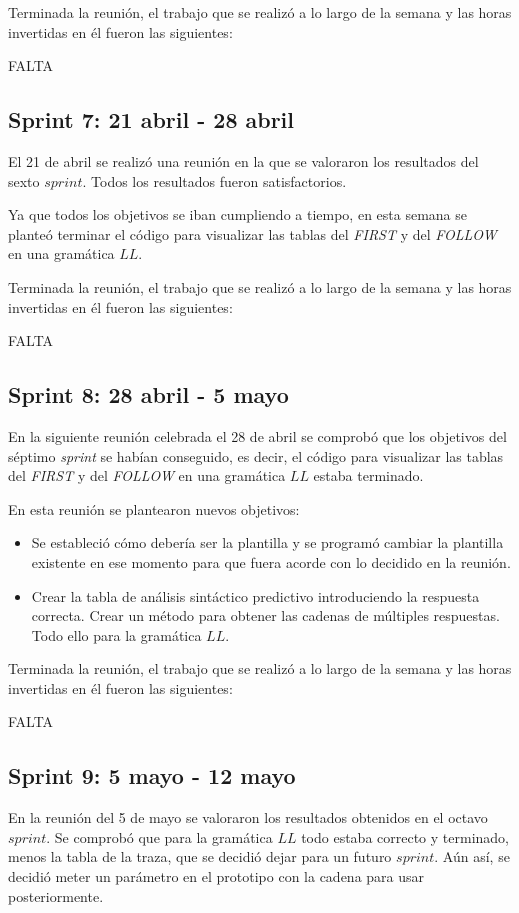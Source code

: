 Terminada la reunión, el trabajo que se realizó a lo largo de la semana y las horas invertidas en él fueron las siguientes:

FALTA

\subsection{Sprint 7: 21 abril - 28 abril}
El 21 de abril se realizó una reunión en la que se valoraron los resultados del sexto $sprint$. Todos los resultados fueron satisfactorios.

Ya que todos los objetivos se iban cumpliendo a tiempo, en esta semana se planteó terminar el código para visualizar las tablas del \textit{FIRST} y del \textit{FOLLOW} en una gramática $LL$.

Terminada la reunión, el trabajo que se realizó a lo largo de la semana y las horas invertidas en él fueron las siguientes:

FALTA
\subsection{Sprint 8: 28 abril - 5 mayo}
En la siguiente reunión celebrada el 28 de abril se comprobó que los objetivos del séptimo \textit{sprint} se habían conseguido, es decir, el código para visualizar las tablas del \textit{FIRST} y del \textit{FOLLOW} en una gramática $LL$ estaba terminado.

En esta reunión se plantearon nuevos objetivos:
\begin{itemize}
\item Se estableció cómo debería ser la plantilla y se programó cambiar la plantilla existente en ese momento para que fuera acorde con lo decidido en la reunión.
\item Crear la tabla de análisis sintáctico predictivo introduciendo la respuesta correcta. Crear un método para obtener las cadenas de múltiples respuestas. Todo ello para la gramática $LL$. 
\end{itemize}

Terminada la reunión, el trabajo que se realizó a lo largo de la semana y las horas invertidas en él fueron las siguientes:

FALTA

\subsection{Sprint 9: 5 mayo - 12 mayo}
En la reunión del 5 de mayo se valoraron los resultados obtenidos en el octavo $sprint$. Se comprobó que para la gramática $LL$ todo estaba correcto y terminado, menos la tabla de la traza, que se decidió dejar para un futuro $sprint$. Aún así, se decidió meter un parámetro en el prototipo con la cadena para usar posteriormente.

